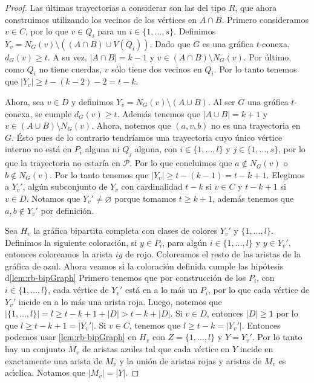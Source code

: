 \begin{proof}
    Las \'ultimas trayectorias a considerar son las del tipo $R$, que ahora
    construimos utilizando los vecinos de los v\'ertices en $A \cap B$. Primero
    consideramos $v \in C$, por lo que $v \in Q_i$ para un  $i \in \{1, \dots,
    s\}$. Definimos $Y_v = N_G(v) \setminus ((A \cap B) \cup V(Q_i))$. Dado que
    $G$ es una gr\'afica $t$-conexa, $d_G(v) \geq t$. A su vez, $|A \cap B| =k
    -1$ y $v \in (A \cap B) \setminus N_G(v)$. Por \'ultimo, como $Q_i$ no tiene
    cuerdas, $v$ s\'olo tiene dos vecinos en $Q_i$. Por lo tanto tenemos que
    $|Y_v| \geq t- (k-2)-2 = t-k$. 
    
    Ahora, sea $v \in D$ y definimos $Y_v = N_G(v) \setminus (A \cup B)$. Al ser
    $G$ una gr\'afica $t$-conexa, se cumple $d_G(v) \geq t$. Adem\'as tenemos
    que $|A \cup B| = k + 1$ y $v \in (A \cup B) \setminus N_G(v)$. Ahora,
    notemos que $(a, v, b)$ no es una trayectoria en $G$. \'Esto pues de lo
    contrario tendr\'iamos una trayectoria cuyo \'unico v\'ertice interno no
    est\'a en $P_i$ alguna ni $Q_j$ alguna, con $i \in \{1, \dots, l\}$ y $j \in
    \{1, \dots, s\}$, por lo que la trayectoria no estar\'ia en $\mathcal{P}$.
    Por lo que concluimos que $a \notin N_G(v)$ o $b \notin N_G(v)$. Por lo
    tanto tenemos que $|Y_v| \geq t- (k-1) = t-k + 1$. Elegimos a $Y_v '$,
    alg\'un subconjunto de $Y_v$ con cardinalidad $t-k$ si $v \in C$ y $t- k+ 1$
    si $v \in D$. Notamos que $Y_v ' \neq \varnothing$ porque tomamos $t \geq k
    + 1$, adem\'as tenemos que $a, b \notin Y_v '$ por definici\'on. 

    Sea $H_v$ la gr\'afica bipartita completa con clases de colores $Y_v '$ y
    $\{1,\dots, l\}$. Definimos la siguiente coloraci\'on, si $y \in P_i$, para
    alg\'un $i \in \{1, \dots, l\}$ y $y \in Y_v '$, entonces coloreamos la
    arista $iy$ de rojo. Coloreamos el resto de las aristas de la gr\'afica de
    azul. Ahora veamos si la coloraci\'on definida cumple las hip\'otesis
    d\cref{lem:rb-bipGraph} Primero tenemos que por construcci\'on
    de los $P_i$, con $i \in \{1, \dots, l\}$, cada v\'ertice de $Y_v '$ est\'a
    en a lo m\'as un $P_i$, por lo que cada v\'ertice de $Y_v '$ incide en a lo
    m\'as una arista roja. Luego, notemos que $|\{1, \dots, l\}| = l  \geq t-k+
    1+ |D| > t-k + |D|$. Si $v \in D$, entonces $|D| \geq 1$ por lo que $l \geq
    t- k+1 = |Y_v '|$. Si $v \in C$, tenemos que $l \geq t-k = |Y_v '|$.
    Entonces podemos usar \cref{lem:rb-bipGraph} en $H_v$ con $Z=
    \{1, \dots, l\}$ y $Y = Y_v '$. Por lo tanto hay un conjunto $M_v$ de
    aristas azules tal que cada v\'ertice en $Y$ incide en exactamente una
    arista de $M_v$ y la uni\'on de aristas rojas y aristas de $M_v$ es
    ac\'\i{}clica. Notamos que $|M_v|=|Y|$.


\end{proof}
